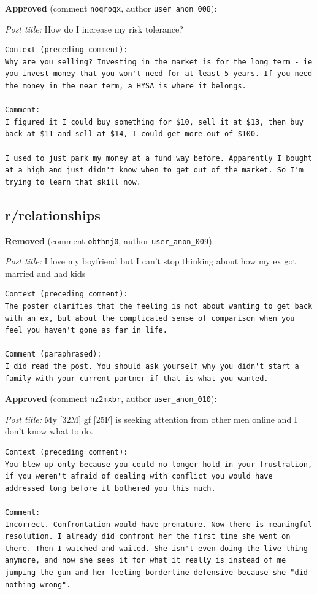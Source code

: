 \noindent\textbf{Approved} (comment \texttt{noqroqx}, author \texttt{user\_anon\_008}):

\noindent\emph{Post title:} How do I increase my risk tolerance?

\begin{lstlisting}
Context (preceding comment):
Why are you selling? Investing in the market is for the long term - ie you invest money that you won't need for at least 5 years. If you need the money in the near term, a HYSA is where it belongs.

Comment:
I figured it I could buy something for $10, sell it at $13, then buy back at $11 and sell at $14, I could get more out of $100.

I used to just park my money at a fund way before. Apparently I bought at a high and just didn't know when to get out of the market. So I'm trying to learn that skill now.
\end{lstlisting}


\subsection*{r/relationships}

\noindent\textbf{Removed} (comment \texttt{obthnj0}, author \texttt{user\_anon\_009}):

\noindent\emph{Post title:} I love my boyfriend but I can't stop thinking about how my ex got married and had kids

\begin{lstlisting}
Context (preceding comment):
The poster clarifies that the feeling is not about wanting to get back with an ex, but about the complicated sense of comparison when you feel you haven't gone as far in life.

Comment (paraphrased):
I did read the post. You should ask yourself why you didn't start a family with your current partner if that is what you wanted.
\end{lstlisting}

\noindent\textbf{Approved} (comment \texttt{nz2mxbr}, author \texttt{user\_anon\_010}):

\noindent\emph{Post title:} My [32M] gf [25F] is seeking attention from other men online and I don't know what to do.

\begin{lstlisting}
Context (preceding comment):
You blew up only because you could no longer hold in your frustration, if you weren't afraid of dealing with conflict you would have addressed long before it bothered you this much.

Comment:
Incorrect. Confrontation would have premature. Now there is meaningful resolution. I already did confront her the first time she went on there. Then I watched and waited. She isn't even doing the live thing anymore, and now she sees it for what it really is instead of me jumping the gun and her feeling borderline defensive because she "did nothing wrong".
\end{lstlisting}


